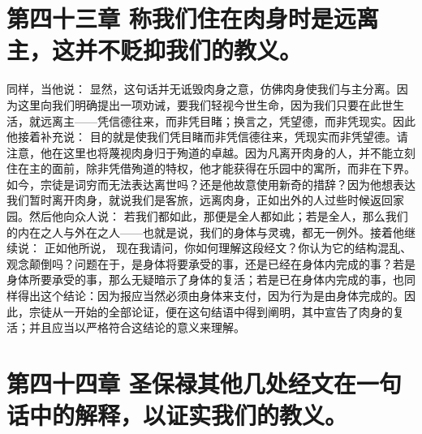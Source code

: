 
\section{第四十三章 称我们住在肉身时是远离主，这并不贬抑我们的教义。}

同样，当他说： 显然，这句话并无诋毁肉身之意，仿佛肉身使我们与主分离。因为这里向我们明确提出一项劝诫，要我们轻视今世生命，因为我们只要在此世生活，就远离主——凭信德往来，而非凭目睹；换言之，凭望德，而非凭现实。因此他接着补充说： 目的就是使我们凭目睹而非凭信德往来，凭现实而非凭望德。请注意，他在这里也将蔑视肉身归于殉道的卓越。因为凡离开肉身的人，并不能立刻住在主的面前，除非凭借殉道的特权，他才能获得在乐园中的寓所，而非在下界。如今，宗徒是词穷而无法表达离世吗？还是他故意使用新奇的措辞？因为他想表达我们暂时离开肉身，就说我们是客旅，远离肉身，正如出外的人过些时候返回家园。然后他向众人说： 若我们都如此，那便是全人都如此；若是全人，那么我们的内在之人与外在之人——也就是说，我们的身体与灵魂，都无一例外。接着他继续说： 正如他所说， 现在我请问，你如何理解这段经文？你认为它的结构混乱、观念颠倒吗？问题在于，是身体将要承受的事，还是已经在身体内完成的事？若是身体所要承受的事，那么无疑暗示了身体的复活；若是已在身体内完成的事，也同样得出这个结论：因为报应当然必须由身体来支付，因为行为是由身体完成的。因此，宗徒从一开始的全部论证，便在这句结语中得到阐明，其中宣告了肉身的复活；并且应当以严格符合这结论的意义来理解。\par


\section{第四十四章 圣保禄其他几处经文在一句话中的解释，以证实我们的教义。}

